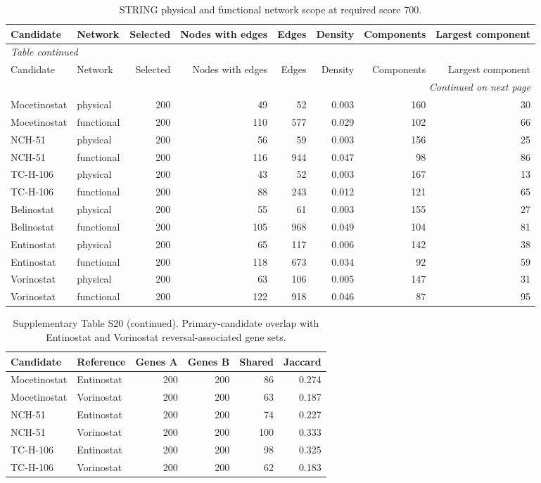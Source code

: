 \begingroup
\footnotesize
\begin{longtable}{@{}llrrrrrr@{}}
\caption{STRING physical and functional network scope at required score 700.}\label{tab:s_network}\\
\toprule
Candidate & Network & Selected & Nodes with edges & Edges & Density & Components & Largest component \\
\midrule
\endfirsthead
\multicolumn{8}{l}{\textit{Table continued}}\\
\toprule
Candidate & Network & Selected & Nodes with edges & Edges & Density & Components & Largest component \\
\midrule
\endhead
\midrule
\multicolumn{8}{r}{\textit{Continued on next page}}\\
\endfoot
\bottomrule
\endlastfoot
Mocetinostat & physical & 200 & 49 & 52 & 0.003 & 160 & 30 \\
Mocetinostat & functional & 200 & 110 & 577 & 0.029 & 102 & 66 \\
NCH-51 & physical & 200 & 56 & 59 & 0.003 & 156 & 25 \\
NCH-51 & functional & 200 & 116 & 944 & 0.047 & 98 & 86 \\
TC-H-106 & physical & 200 & 43 & 52 & 0.003 & 167 & 13 \\
TC-H-106 & functional & 200 & 88 & 243 & 0.012 & 121 & 65 \\
Belinostat & physical & 200 & 55 & 61 & 0.003 & 155 & 27 \\
Belinostat & functional & 200 & 105 & 968 & 0.049 & 104 & 81 \\
Entinostat & physical & 200 & 65 & 117 & 0.006 & 142 & 38 \\
Entinostat & functional & 200 & 118 & 673 & 0.034 & 92 & 59 \\
Vorinostat & physical & 200 & 63 & 106 & 0.005 & 147 & 31 \\
Vorinostat & functional & 200 & 122 & 918 & 0.046 & 87 & 95 \\
\end{longtable}
\endgroup
\begingroup
\small
\begin{table}[H]
\centering
\caption*{Supplementary Table S20 (continued). Primary-candidate overlap with Entinostat and Vorinostat reversal-associated gene sets.}
\begin{tabular}{@{}llrrrr@{}}
\toprule
Candidate & Reference & Genes A & Genes B & Shared & Jaccard \\
\midrule
Mocetinostat & Entinostat & 200 & 200 & 86 & 0.274 \\
Mocetinostat & Vorinostat & 200 & 200 & 63 & 0.187 \\
NCH-51 & Entinostat & 200 & 200 & 74 & 0.227 \\
NCH-51 & Vorinostat & 200 & 200 & 100 & 0.333 \\
TC-H-106 & Entinostat & 200 & 200 & 98 & 0.325 \\
TC-H-106 & Vorinostat & 200 & 200 & 62 & 0.183 \\
\bottomrule
\end{tabular}
\end{table}
\endgroup
